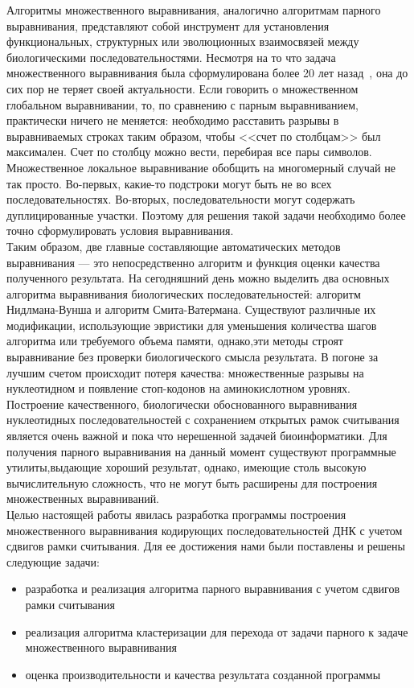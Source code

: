 \indent Алгоритмы множественного выравнивания, аналогично алгоритмам парного выравнивания, представляют собой инструмент для установления функциональных, структурных или эволюционных взаимосвязей между биологическими последовательностями.  Несмотря на то что задача множественного выравнивания была сформулирована более 20 лет назад~\cite{SIAM_Journal}, она до сих пор не теряет своей актуальности. Если говорить о множественном глобальном выравнивании, то, по сравнению с парным выравниванием, практически ничего не меняется: необходимо расставить разрывы в выравниваемых строках таким образом, чтобы <<счет по столбцам>> был максимален. Счет по столбцу можно вести, перебирая все пары символов. Множественное локальное выравнивание обобщить на многомерный случай не так просто. Во-первых, какие-то подстроки могут быть не во всех последовательностях. Во-вторых, последовательности могут содержать дуплицированные участки. Поэтому для решения такой задачи необходимо более точно сформулировать условия выравнивания.\\ 
\indent Таким образом, две главные составляющие автоматических методов выравнивания --- это непосредственно алгоритм и функция оценки качества полученного результата. На сегодняшний день можно выделить два основных алгоритма выравнивания биологических последовательностей: алгоритм Нидлмана-Вунша и алгоритм Смита-Ватермана.  Существуют различные их модификации, использующие эвристики для уменьшения количества шагов алгоритма или требуемого объема памяти, однако,эти методы строят выравнивание без проверки биологического смысла результата. В погоне за лучшим счетом происходит потеря качества: множественные разрывы на нуклеотидном и появление стоп-кодонов на аминокислотном уровнях.\\ 
\indent Построение качественного, биологически обоснованного выравнивания нуклеотидных последовательностей с сохранением открытых рамок считывания является очень важной и пока что нерешенной задачей биоинформатики. Для получения парного выравнивания на данный момент существуют программные утилиты,выдающие хороший результат, однако, имеющие столь высокую вычислительную сложность, что не могут быть расширены для построения множественных выравниваний.\\ 
\indent Целью настоящей работы явилась разработка программы построения множественного выравнивания кодирующих последовательностей ДНК с учетом сдвигов рамки считывания. Для ее достижения нами были поставлены и решены следующие задачи:
\begin{itemize}
\item разработка и реализация алгоритма парного выравнивания с учетом сдвигов рамки считывания
\item реализация алгоритма кластеризации для перехода от задачи парного к задаче множественного выравнивания
\item оценка производительности и качества результата созданной программы
\end{itemize}
